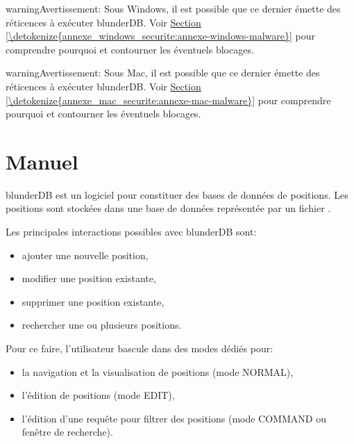\documentclass[letterpaper,10pt,french]{sphinxmanual}
\begin{document}
\begin{sphinxadmonition}{warning}{Avertissement:}
\sphinxAtStartPar
Sous Windows, il est possible que ce dernier émette des réticences
à exécuter blunderDB. Voir \hyperref[\detokenize{annexe_windows_securite:annexe-windows-malware}]{Section \ref{\detokenize{annexe_windows_securite:annexe-windows-malware}}} pour comprendre
pourquoi et contourner les éventuels blocages.
\end{sphinxadmonition}

\begin{sphinxadmonition}{warning}{Avertissement:}
\sphinxAtStartPar
Sous Mac, il est possible que ce dernier émette des réticences
à exécuter blunderDB. Voir \hyperref[\detokenize{annexe_mac_securite:annexe-mac-malware}]{Section \ref{\detokenize{annexe_mac_securite:annexe-mac-malware}}} pour comprendre
pourquoi et contourner les éventuels blocages.
\end{sphinxadmonition}

\sphinxstepscope


\section{Manuel}
\label{\detokenize{manuel:manuel}}\label{\detokenize{manuel:id1}}\label{\detokenize{manuel::doc}}
\sphinxAtStartPar
blunderDB est un logiciel pour constituer des bases de données de
positions. Les positions sont stockées dans une base de données représentée par un fichier
.

\sphinxAtStartPar
Les principales interactions possibles avec blunderDB sont:
\begin{itemize}
\item {} 
\sphinxAtStartPar
ajouter une nouvelle position,

\item {} 
\sphinxAtStartPar
modifier une position existante,

\item {} 
\sphinxAtStartPar
supprimer une position existante,

\item {} 
\sphinxAtStartPar
rechercher une ou plusieurs positions.

\end{itemize}

\sphinxAtStartPar
Pour ce faire, l’utilisateur bascule dans des modes dédiés pour:
\begin{itemize}
\item {} 
\sphinxAtStartPar
la navigation et la visualisation de positions (mode NORMAL),

\item {} 
\sphinxAtStartPar
l’édition de positions (mode EDIT),

\item {} 
\sphinxAtStartPar
l’édition d’une requête pour filtrer des positions (mode COMMAND ou fenêtre de recherche).

\end{itemize}
\end{document}
